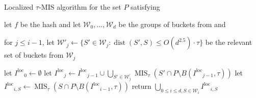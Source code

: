 \documentclass[11pt,letterpaper]{article}
\theoremstyle{plain}
\theoremstyle{definition}
\theoremstyle{remark}
\DeclareMathOperator{\dist}{dist}
\DeclareMathOperator{\MIS}{MIS}
\newcommand{\Iloc}{\ensuremath{I^{\mathrm{loc}}}\xspace}
\begin{document}
\begin{algorithm}[ht]
\caption{Localized $\tau$-MIS algorithm for the set $P$ satisfying }
\label{alg:loc_MIS}
\begin{algorithmic}[1]


    \State let $f$ be the hash and let $\mathcal{W}_0, \ldots, \mathcal{W}_d$ be the groups of buckets from  and 
    
    
    \State for $j \leq i - 1$, let $\mathcal{W}'_j \gets \{ S' \in  \mathcal{W}_j : \dist(S', S) \leq O(d^{2.5}) \cdot \tau \}$ be the relevant set of buckets from $\mathcal{W}_j$
    \label{line:Wjprime}
    
    \State let $\Iloc_0 \gets \emptyset$ 
    \State let $\Iloc_j \gets \Iloc_{j - 1} \cup \bigcup_{S' \in \mathcal{W}_j^{'}} \MIS_{\tau}(S'\cap P\setminus B(\Iloc_{j-1}, \tau))$ 
    \label{line:Iloc_i_def}
    \EndFor
    \State let $\Iloc_{i, S} \gets \MIS_\tau(S \cap P \setminus B(\Iloc_{i - 1}, \tau))$
    \label{line:Iloc_MIS_def}
    \EndFor
    \EndFor
    \State return $\bigcup_{0\leq i \leq d, S \in \mathcal{W}_i} \Iloc_{i, S}$
    \label{line:Iloc_d_def}
\end{algorithmic}
\end{algorithm}
\end{document}

